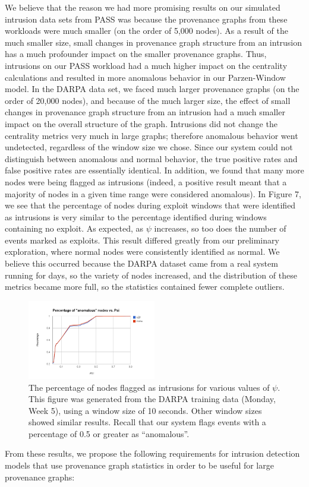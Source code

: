 \documentclass[10pt,twocolumn]{article}
\begin{document}
We believe that the reason we had more promising results on our simulated intrusion data sets from PASS was because the provenance graphs from these workloads were much smaller (on the order of 5,000 nodes). As a result of the much smaller size, small changes in provenance graph structure from an intrusion has a much profounder impact on the smaller provenance graphs. Thus, intrusions on our PASS workload had a much higher impact on the centrality calculations and resulted in more anomalous behavior in our Parzen-Window model. In the DARPA data set, we faced much larger provenance graphs (on the order of 20,000 nodes), and because of the much larger size, the effect of small changes in provenance graph structure from an intrusion had a much smaller impact on the overall structure of the graph. Intrusions did not change the centrality metrics very much in large graphs; therefore anomalous behavior went undetected, regardless of the window size we chose. Since our system could not distinguish between anomalous and normal behavior, the true positive rates and false positive rates are essentially identical. In addition, we found that many more nodes were being flagged as intrusions (indeed, a positive result meant that a majority of nodes in a given time range were considered anomalous). In Figure 7, we see that the percentage of nodes during exploit windows that were identified as intrusions is very similar to the percentage identified during windows containing no exploit. As expected, as $\psi$ increases, so too does the number of events marked as exploits. This result differed greatly from our preliminary exploration, where normal nodes were consistently identified as normal. We believe this occurred because the DARPA dataset came from a real system running for days, so the variety of nodes increased, and the distribution of these metrics became more full, so the statistics contained fewer complete outliers. 
\begin{figure}
  \label{intrusion-v-psi}
  \centering
    \includegraphics[width=0.5\textwidth]{img/intrusion_v_psi.png}
    \caption{The percentage of nodes flagged as intrusions for various values of $\psi$. This figure was generated from the DARPA training data (Monday, Week 5), using a window size of 10 seconds. Other window sizes showed similar results. Recall that our system flags events with a percentage of 0.5 or greater as ``anomalous''.} 
\end{figure}
From these results, we propose the following requirements for intrusion detection models that use provenance graph statistics in order to be useful for large provenance graphs:
\end{document}
